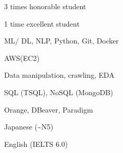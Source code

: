 \documentclass[11pt]{spidercv}
\begin{document}
	\begin{SideBar}{\ColorBackground}{\ColorTextSide}
		\vspace{-0.5cm}
		\begin{ItemList}{\ColorHighlight}
			\item \hspace{-.5cm} 3 times honorable student
			\item \hspace{-.5cm} 1 time excellent student
		\end{ItemList}
		
		
		\vspace{-0.5cm}
		\begin{ItemList}{\ColorHighlight}
			\item  \hspace{-.5cm} ML/ DL, NLP, Python, Git, Docker\\
			\item  \hspace{-.5cm} AWS(EC2)
		\end{ItemList}
		
		
		\vspace{-0.5cm}
		\begin{ItemList}{\ColorHighlight}
			\item \hspace{-.5cm} Data manipulation, crawling, EDA
			\item \hspace{-.5cm} SQL (TSQL), NoSQL (MongoDB)
		\end{ItemList}
		
				
		\vspace{-0.5cm}
		\begin{ItemList}{\ColorHighlight}
			\item  \hspace{-.5cm} Orange, DBeaver, Paradigm
		\end{ItemList}
				
		
		\vspace{-0.5cm}
		\begin{ItemList}{\ColorHighlight}
			\item \hspace{-.5cm} Japanese (\textasciitilde N5)
			\item \hspace{-.5cm} English (IELTS 6.0)
		\end{ItemList}
		

\end{SideBar}
\end{document}
